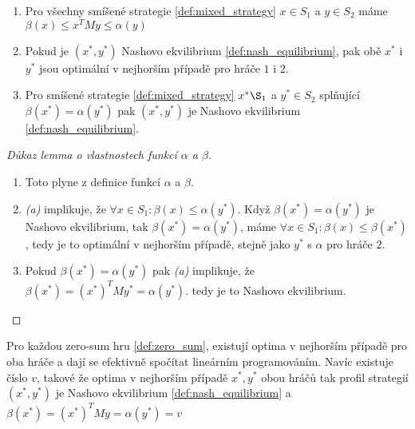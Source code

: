 \begin{theorem}
\label{thm:lemma_alpha_beta}
\begin{enumerate}
    \item Pro všechny smíšené strategie \ref{def:mixed_strategy} $x \in S_1$ a $y \in S_2$ máme $\beta(x) \leq x^T M y\leq \alpha(y)$ 
    \item Pokud je $(x^*, y^*)$ Nashovo ekvilibrium \ref{def:nash_equilibrium}, pak obě $x^*$ i $y^*$ jsou optimální v nejhorším případě pro hráče $1$ i $2$. 
    \item Pro smíšené strategie \ref{def:mixed_strategy} $x^* \S_1$ a $y^* \in S_2$ splňující $\beta(x^*) = \alpha(y^*)$ pak $(x^*, y^*)$ je Nashovo ekvilibrium \ref{def:nash_equilibrium}.
\end{enumerate}
\end{theorem}
\begin{proof}[Důkaz lemma o vlastnostech funkcí $\alpha$ a $\beta$]
\begin{enumerate}
    \item Toto plyne z definice funkcí $\alpha$ a $\beta$. 
    \item \textit{(a)} implikuje, že $\forall x \in S_1: \beta(x) \leq \alpha(y^*)$. Když $\beta(x^*) = \alpha(y^*)$ je Nashovo ekvilibrium, tak $\beta(x^*) = \alpha(y^*)$, máme $\forall x \in S_1: \beta(x) \leq \beta(x^*)$, tedy je to optimální v nejhorším případě, stejně jako $y^*$ s $\alpha$ pro hráče $2$.
    \item Pokud $\beta(x^*) = \alpha(y^*)$ pak \textit{(a)} implikuje, že $\beta(x^*) = (x^*)^T M y^* = \alpha(y^*)$. tedy je to Nashovo ekvilibrium. 
\end{enumerate}
\end{proof}

\begin{theorem}
\label{thm:minimax}
Pro každou zero-sum hru \ref{def:zero_sum}, existují optima v nejhorším případě pro oba hráče a dají se efektivně spočítat lineárním programováním. 
Navíc existuje číslo $v$, takové že optima v nejhorším případě $x^*, y^*$ obou hráčů tak profil strategií $(x^*, y^*)$ je Nashovo ekvilibrium \ref{def:nash_equilibrium} a $\beta(x^*) = (x^*)^T M y = \alpha(y^*) = v$ 
\end{theorem}

